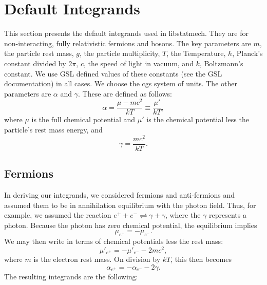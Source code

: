 \documentclass{article}    %
\begin{document}
\section{Default Integrands}
\label{sec:default}

This section presents the default integrands used in libstatmech.  They
are for non-interacting, fully relativistic fermions and bosons.  The key
parameters are $m$, the particle rest mass, $g$, the particle multiplicity,
$T$, the Temperature, $\hbar$, Planck's constant divided by $2\pi$, $c$,
the speed of light in vacuum, and $k$, Boltzmann's constant.  We use
GSL defined values of these constants (see the GSL documentation) in all
cases.  We choose the cgs system of units.  The other parameters are
$\alpha$ and $\gamma$.  These are defined as follows:
\[
\alpha = \frac{\mu-mc^2}{kT} \equiv \frac{\mu'}{kT},
\]
where $\mu$ is the full chemical potential and $\mu'$ is the chemical potential
less the particle's rest mass energy, and
\[
\gamma = \frac{mc^2}{kT}.
\]

\subsection{Fermions}

In deriving our integrands, we considered fermions and anti-fermions and
assumed them to be in annihilation equilibrium with the photon field.  Thus,
for example, we assumed the reaction $e^+ + e^- \rightleftharpoons \gamma +
\gamma$, where the $\gamma$ represents a photon.  Because the photon has
zero chemical potential, the equilibrium implies
\[
\mu_{e^+} = -\mu_{e^-}.
\]
We may then write in terms of chemical potentials less the rest mass:
\[
\mu'_{e^+} = -\mu'_{e^-} - 2mc^2,
\]
where $m$ is the electron rest mass.  On division by $kT$, this then becomes
\[
\alpha_{e^+} = -\alpha_{e^-} - 2\gamma.
\]
The resulting integrands are the following:
\end{document}
